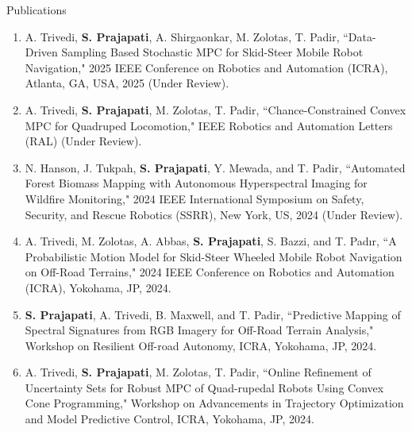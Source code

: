 \documentclass{resume}
\begin{document}
\begin{rSection}{Publications}
\begin{enumerate}[leftmargin=0.5cm]
    \item A. Trivedi, \textbf{S. Prajapati}, A. Shirgaonkar, M. Zolotas, T. Padir, ``Data-Driven Sampling Based Stochastic MPC for Skid-Steer Mobile
Robot Navigation," 2025 IEEE Conference on Robotics and Automation (ICRA), Atlanta, GA, USA, 2025 (Under Review).
    \item A. Trivedi, \textbf{S. Prajapati}, M. Zolotas, T. Padir, ``Chance-Constrained Convex MPC for Quadruped Locomotion," IEEE Robotics and Automation Letters (RAL) (Under Review).
    \item N. Hanson, J. Tukpah, \textbf{S. Prajapati}, Y. Mewada, and T. Padir, ``Automated Forest Biomass Mapping with Autonomous Hyperspectral
Imaging for Wildfire Monitoring," 2024 IEEE International Symposium on Safety, Security, and Rescue Robotics (SSRR), New York, US, 2024 (Under Review).
    \item A. Trivedi, M. Zolotas, A. Abbas, \textbf{S. Prajapati}, S. Bazzi, and T. Padır, ``A Probabilistic Motion Model for Skid-Steer Wheeled Mobile Robot Navigation on Off-Road Terrains," 2024 IEEE Conference on Robotics and Automation (ICRA), Yokohama, JP, 2024.
    \item \vspace{-0.3em} \textbf{S. Prajapati}, A. Trivedi, B. Maxwell, and T. Padir, ``Predictive Mapping of Spectral Signatures from RGB Imagery for Off-Road Terrain Analysis," Workshop on Resilient Off-road Autonomy, ICRA, Yokohama, JP, 2024.
    
    \item \vspace{-0.3em} A. Trivedi, \textbf{S. Prajapati}, M. Zolotas, T. Padir, ``Online Refinement of Uncertainty Sets for Robust MPC of Quad-rupedal
    Robots Using Convex Cone Programming," Workshop on Advancements in Trajectory Optimization and Model Predictive Control, ICRA, Yokohama, JP, 2024.
    

\end{enumerate}
\end{rSection}
\end{document}

